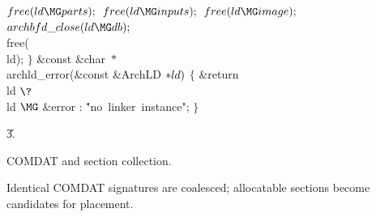 ${}\\{free}(\\{ld}\MG\\{parts});{}$\6
${}\\{free}(\\{ld}\MG\\{inputs});{}$\6
${}\\{free}(\\{ld}\MG\\{image});{}$\6
${}\\{archbfd\_close}(\\{ld}\MG\\{db});{}$\6
\\{free}(\\{ld});\6
\4${}\}{}$\2\6
\1\1\&{const} \&{char} ${}{*}{}$\\{archld\_error}(\&{const} \&{ArchLD} ${}{*}%
\\{ld})$ $\{$ \&{return} \\{ld} $\?$ \\{ld} $\MG$ \&{error} : \.{"no\ linker\
instance"}; $\}{}$\par
\U3.\fi


\fi

COMDAT and section collection.

Identical COMDAT signatures are coalesced; allocatable sections become
candidates for placement.

